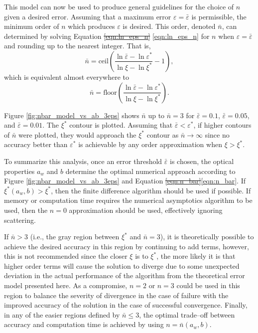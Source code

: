 \documentclass[ms,cpyr,lof,lot]{uathesis}
\newcommand{\ceil}{\mbox{ceil}}
\newcommand{\floor}{\mbox{floor}}
\providecommand{\DIFdel}[1]{{\protect\color{red}\sout{#1}}}                      %
\providecommand{\DIFaddbegin}{} %
\providecommand{\DIFaddend}{} %
\providecommand{\DIFdelbegin}{} %
\providecommand{\DIFdelend}{} %
\newcommand{\DIFscaledelfig}{0.5}
\newlength{\DIFdelgraphicswidth} %
\newlength{\DIFdelgraphicsheight} %
\newcommand{\DIFaddincludegraphics}[2][]{{\color{blue}\fbox{\DIFOincludegraphics[#1]{#2}}}} %
\newcommand{\DIFdelincludegraphics}[2][]{%
\sbox{\DIFdelgraphicsbox}{\DIFOincludegraphics[#1]{#2}}%
\settoboxwidth{\DIFdelgraphicswidth}{\DIFdelgraphicsbox} %
\settoboxtotalheight{\DIFdelgraphicsheight}{\DIFdelgraphicsbox} %
\scalebox{\DIFscaledelfig}{%
\parbox[b]{\DIFdelgraphicswidth}{\usebox{\DIFdelgraphicsbox}\\[-\baselineskip] \rule{\DIFdelgraphicswidth}{0em}}\llap{\resizebox{\DIFdelgraphicswidth}{\DIFdelgraphicsheight}{%
\setlength{\unitlength}{\DIFdelgraphicswidth}%
\begin{picture}(1,1)%
\thicklines\linethickness{2pt} %
{\color[rgb]{1,0,0}\put(0,0){\framebox(1,1){}}}%
{\color[rgb]{1,0,0}\put(0,0){\line( 1,1){1}}}%
{\color[rgb]{1,0,0}\put(0,1){\line(1,-1){1}}}%
\end{picture}%
}\hspace*{3pt}}} %
} %
\DeclareRobustCommand{\DIFaddbegin}{\DIFOaddbegin \let\includegraphics\DIFaddincludegraphics} %
\DeclareRobustCommand{\DIFaddend}{\DIFOaddend \let\includegraphics\DIFOincludegraphics} %
\DeclareRobustCommand{\DIFdelbegin}{\DIFOdelbegin \let\includegraphics\DIFdelincludegraphics} %
\DeclareRobustCommand{\DIFdelend}{\DIFOaddend \let\includegraphics\DIFOincludegraphics} %
\begin{document}
This model can now be used to produce general guidelines for the choice of $n$ given a desired error.
Assuming that a maximum error $\varepsilon=\bar\varepsilon$ is permissible, the minimum order of $n$ which produces $\varepsilon$ is desired.
This order, denoted $\bar{n}$, can determined by solving Equation \DIFdelbegin \DIFdel{\ref{eqn:ln_eps_n} }\DIFdelend \DIFaddbegin \eqref{eqn:ln_eps_n} \DIFaddend for $n$ when $\varepsilon=\bar{\varepsilon}$ and rounding up to the nearest integer.
That is,
\begin{equation*}
  \bar{n} = \ceil\left(\frac{\ln\bar{\varepsilon} - \ln\varepsilon^*}{\ln\xi - \ln\xi^*} - 1 \right),
\end{equation*}
which is equivalent almost everywhere to
\begin{equation}
  \label{eqn:n_bar}
  \bar{n} = \floor\left(\frac{\ln\bar{\varepsilon} - \ln\varepsilon^*}{\ln\xi - \ln\xi^*}\right).
\end{equation}

Figure \ref{fig:nbar_model_vs_ab_3eps} shows $\bar{n}$ up to $\bar{n}=3$ for $\bar{\varepsilon}=0.1$, $\bar{\varepsilon}=0.05$, and $\bar{\varepsilon}=0.01$.
The $\xi^*$ contour is plotted.
Assuming that $\bar{\varepsilon}<\varepsilon^*$, if higher contours of $\bar{n}$ were plotted, they would approach the $\xi^*$ contour as $\bar{n} \to \infty$ since no accuracy better than $\varepsilon^*$ is achievable by any order approximation when $\xi > \xi^*$.

To summarize this analysis, once an error threshold $\bar{\varepsilon}$ is chosen, the optical properties $a_w$ and $b$ determine the optimal numerical approach according to Figure \ref{fig:nbar_model_vs_ab_3eps} and Equation \DIFdelbegin \DIFdel{\ref{eqn:n_bar}}\DIFdelend \DIFaddbegin \eqref{eqn:n_bar}\DIFaddend .
If $\xi^*(a_w, b) > \xi^*$, then the finite difference algorithm should be used if possible.
If memory or computation time requires the numerical asymptotics algorithm to be used, then the $n=0$ approximation should be used, effectively ignoring scattering.

If $\bar{n}>3$ (i.e., the gray region between $\xi^*$ and $\bar{n}=3$), it is theoretically possible to achieve the desired accuracy in this region by continuing to add terms, however, this is not recommended since the closer $\xi$ is to $\xi^*$, the more likely it is that higher order terms will cause the solution to diverge due to some unexpected deviation in the actual performance of the algorithm from the theoretical error model presented here.
As a compromise, $n=2$ or $n=3$ could be used in this region to balance the severity of divergence in the case of failure with the improved accuracy of the solution in the case of successful convergence.
Finally, in any of the easier regions defined by $\bar{n} \leq 3$, the optimal trade--off between accuracy and computation time is achieved by using $n=\bar{n}(a_w, b)$.
\end{document}
